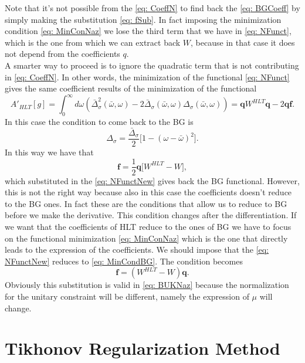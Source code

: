 \documentclass[a4paper,10pt]{article}
\begin{document}
Note that it's not possible from the \eqref{eq: CoeffN} to find back the \eqref{eq: BGCoeff} by simply making the substitution \eqref{eq: fSub}. In fact imposing the minimization condition \eqref{eq: MinConNaz} we lose the third term that we have in \eqref{eq: NFunct}, which is the one from which we can extract back $W$,  because in that case it does not depend from the coefficients $q$.\\
A smarter way to proceed is to ignore the quadratic term that is not contributing in \eqref{eq: CoeffN}. In other words, the minimization of the functional \eqref{eq: NFunct} gives the same coefficient results of the minimization of the functional
\begin{equation}\label{eq: NFunctNew}
A'_{HLT}[g] = \int_0^\infty d\omega (\bar{\Delta}_\sigma^2(\bar{\omega}, \omega) - 2\bar{\Delta}_\sigma(\bar{\omega}, \omega)\Delta_\sigma(\bar{\omega}, \omega)) = \textbf{q} W^{HLT} \textbf{q} - 2\textbf{q} \textbf{f}.
\end{equation}
In this case the condition to come back to the BG is 
\begin{equation}
\Delta_\sigma = \frac{\bar{\Delta}_\sigma}{2}\big[1-(\omega-\bar{\omega})^2\big].
\end{equation}
In this way we have that
\begin{equation}
\textbf{f} = \frac{1}{2}\textbf{q}\big[W^{HLT} - W \big], 
\end{equation}
which substituted in the \eqref{eq: NFunctNew} gives back the BG functional. However, this is not the right way because also in this case the coefficients doesn't reduce to the BG ones. In fact these are the conditions that allow us to reduce to BG before we make the derivative. This condition changes after the differentiation. If we want that the coefficients of HLT reduce to the ones of BG we have to focus on the functional minimization \eqref{eq: MinConNaz} which is the one that directly leads to the expression of the coefficients. We should impose that the \eqref{eq: NFunctNew} reduces to \eqref{eq: MinCondBG}. The condition becomes 
\begin{equation}
\textbf{f} = (W^{HLT}-W)\textbf{q}.
\end{equation}
Obviously this substitution is valid in \eqref{eq: BUKNaz} because the normalization for the unitary constraint will be different, namely the expression of $\mu$ will change.

\section{Tikhonov Regularization Method}
\end{document}
